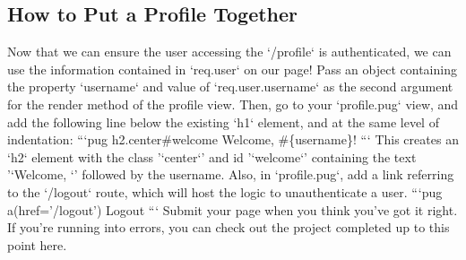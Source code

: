 \documentclass{article}%
\begin{document}
\subsection{How to Put a Profile Together}%
\label{subsec:HowtoPutaProfileTogether}%
Now that we can ensure the user accessing the `/profile` is authenticated, we can use the information contained in `req.user` on our page!\newline%
Pass an object containing the property `username` and value of `req.user.username` as the second argument for the render method of the profile view. Then, go to your `profile.pug` view, and add the following line below the existing `h1` element, and at the same level of indentation:\newline%
```pug\newline%
h2.center\#welcome Welcome, \#\{username\}!\newline%
```\newline%
This creates an `h2` element with the class '`center`' and id '`welcome`' containing the text '`Welcome, `' followed by the username.\newline%
Also, in `profile.pug`, add a link referring to the `/logout` route, which will host the logic to unauthenticate a user.\newline%
```pug\newline%
a(href='/logout') Logout\newline%
```\newline%
Submit your page when you think you've got it right. If you're running into errors, you can check out the project completed up to this point here.\newline%

%
\end{document}
